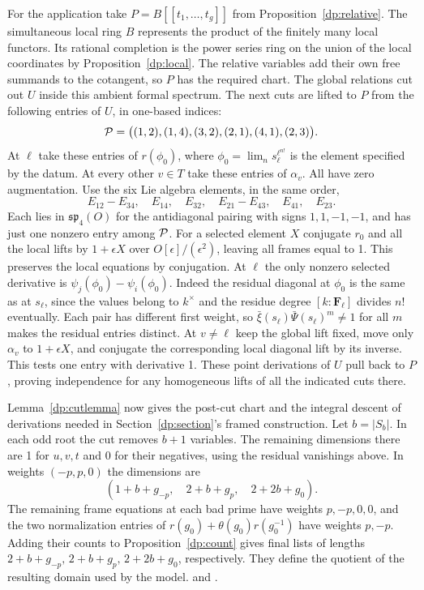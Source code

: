 For the application take \(P=B[[t_1,\ldots,t_g]]\) from
Proposition~\ref{dp:relative}. The simultaneous local ring \(B\)
represents the product of the finitely many local functors. Its
rational completion is the power series ring on the union of the
local coordinates by Proposition~\ref{dp:local}. The relative
variables add their own free summands to the cotangent, so \(P\)
has the required chart. The global relations cut out \(U\) inside
this ambient formal spectrum. The next cuts are lifted to \(P\)
from the following entries of \(U\), in one-based indices:
\[
 {\cal P}=\big((1,2),(1,4),(3,2),(2,1),(4,1),(2,3)\big).
\]
At \(\ell\) take these entries of \(r(\phi_0)\), where
\(\phi_0=\lim_n s_\ell^{\ell^{n!}}\) is the element specified by the
datum. At every other \(v\in T\) take these entries of \(\alpha_v\).
All have zero augmentation. Use the six Lie algebra elements,
in the same order,
\[
 E_{12}-E_{34},\quad E_{14},\quad E_{32},\quad
 E_{21}-E_{43},\quad E_{41},\quad E_{23}.
\]
Each lies in \(\mathfrak {sp}_4(O)\) for the antidiagonal pairing with
signs \(1,1,-1,-1\), and has just one nonzero entry among \({\cal P}\).
For a selected element \(X\) conjugate \(r_0\) and all the local lifts
by \(1+\epsilon X\) over \(O[\epsilon]/(\epsilon^2)\), leaving all
frames equal to 1. This preserves the local equations by conjugation.
At \(\ell\) the only nonzero selected derivative is
\(\psi_j(\phi_0)-\psi_i(\phi_0)\). Indeed the residual diagonal at
\(\phi_0\) is the same as at \(s_\ell\), since the values belong to
\(k^\times\) and the residue degree \([k:\mathbf F_\ell]\) divides
\(n!\) eventually. Each pair has different first weight, so
\(\bar\xi(s_\ell)\bar\Psi(s_\ell)^m\ne1\) for all \(m\) makes
the residual entries distinct. At \(v\ne\ell\) keep the global
lift fixed, move only \(\alpha_v\) to \(1+\epsilon X\), and
conjugate the corresponding local diagonal lift by its inverse.
This tests one entry with derivative 1. These point derivations of
\(U\) pull back to \(P\), proving independence for any homogeneous
lifts of all the indicated cuts there.

Lemma~\ref{dp:cutlemma} now gives the post-cut chart and the
integral descent of derivations needed in
Section~\ref{dp:section}'s framed construction. Let \(b=|S_b|\).
In each odd root the cut removes \(b+1\) variables. The remaining
dimensions there are 1 for \(u,v,t\) and 0 for their negatives,
using the residual vanishings above. In weights \((-p,p,0)\)
the dimensions are
\[
 (1+b+g_{-p},\quad 2+b+g_p,\quad 2+2b+g_0).
\]
The remaining frame equations at each bad prime have weights
\(p,-p,0,0\), and the two normalization entries of
\(r(g_0)+\theta(g_0)r(g_0^{-1})\) have weights \(p,-p\).
Adding their counts to Proposition~\ref{dp:count} gives final lists
of lengths \(2+b+g_{-p},\,2+b+g_p,\,2+2b+g_0\), respectively.
They define the quotient of the resulting domain used by the model.
and .

